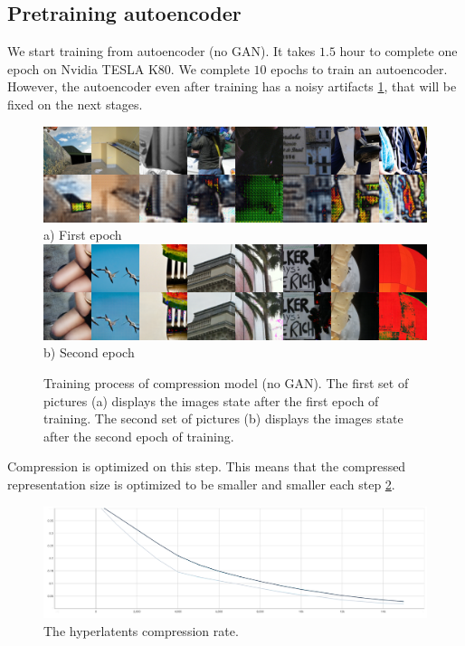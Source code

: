 \subsection{Pretraining autoencoder}

We start training from autoencoder (no GAN). It takes $1.5$ hour to complete one epoch on Nvidia TESLA K80. We complete $10$ epochs to train an autoencoder. However, the autoencoder even after training has a noisy artifacts \ref{training-compression-examples}, that will be fixed on the next stages.

\begin{figure}[!ht]
    \label{training-compression-examples}
    \centering
    \includegraphics[width=\textwidth]{figure/step_1000.png}
    a) First epoch
    \includegraphics[width=\textwidth]{figure/step_15000.png}
    b) Second epoch
    \caption{Training process of compression model (no GAN). The first set of pictures (a) displays the images state after the first epoch of training. The second set of pictures (b) displays the images state after the second epoch of training.}
\end{figure}

Compression is optimized on this step. This means that the compressed representation size is optimized to be smaller and smaller each step \ref{training-compression-q-rate}.

\begin{figure}[!ht]
    \label{training-compression-q-rate}
    \centering
    \includegraphics{figure/compression-q-rate-hyperlatent.png}
    \caption{The hyperlatents compression rate.}
\end{figure}



